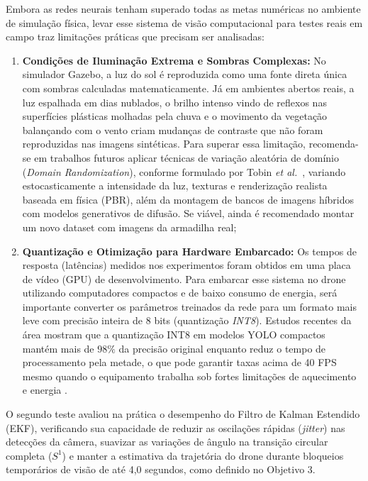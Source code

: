Embora as redes neurais tenham superado todas as metas numéricas no ambiente de simulação física, levar esse sistema de visão computacional para testes reais em campo traz limitações práticas que precisam ser analisadas:
\begin{enumerate}
	
	\item \textbf{Condições de Iluminação Extrema e Sombras Complexas:} No simulador Gazebo, a luz do sol é reproduzida como uma fonte direta única com sombras calculadas matematicamente. Já em ambientes abertos reais, a luz espalhada em dias nublados, o brilho intenso vindo de reflexos nas superfícies plásticas molhadas pela chuva e o movimento da vegetação balançando com o vento criam mudanças de contraste que não foram reproduzidas nas imagens sintéticas. Para superar essa limitação, recomenda-se em trabalhos futuros aplicar técnicas de variação aleatória de domínio (\textit{Domain Randomization}), conforme formulado por Tobin \textit{et al.}~\cite{tobin2017domain}, variando estocasticamente a intensidade da luz, texturas e renderização realista baseada em física (PBR), além da montagem de bancos de imagens híbridos com modelos generativos de difusão. Se viável, ainda é recomendado montar um novo dataset com imagens da armadilha real;
	
	\item \textbf{Quantização e Otimização para Hardware Embarcado:} Os tempos de resposta (latências) medidos nos experimentos foram obtidos em uma placa de vídeo (GPU) de desenvolvimento. Para embarcar esse sistema no drone utilizando computadores compactos e de baixo consumo de energia, será importante converter os parâmetros treinados da rede para um formato mais leve com precisão inteira de 8 bits (quantização \textit{INT8}). Estudos recentes da área mostram que a quantização INT8 em modelos YOLO compactos mantém mais de $98\%$ da precisão original enquanto reduz o tempo de processamento pela metade, o que pode garantir taxas acima de 40 FPS mesmo quando o equipamento trabalha sob fortes limitações de aquecimento e energia \cite{rey2025performance}.
	
\end{enumerate}


O segundo teste avaliou na prática o desempenho do Filtro de Kalman Estendido (EKF), verificando sua capacidade de reduzir as oscilações rápidas (\textit{jitter}) nas detecções da câmera, suavizar as variações de ângulo na transição circular completa ($S^1$) e manter a estimativa da trajetória do drone durante bloqueios temporários de visão de até 4,0 segundos, como definido no Objetivo 3.

